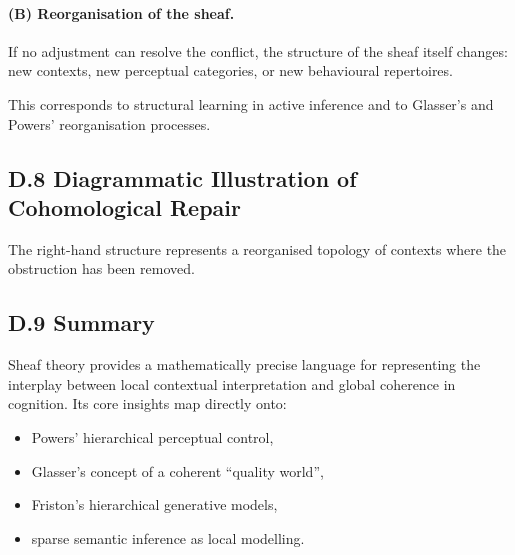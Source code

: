 \documentclass[11pt,a4paper,twoside]{article}
\begin{document}
\paragraph{(B) Reorganisation of the sheaf.}
If no adjustment can resolve the conflict, the structure of the sheaf itself changes: new contexts, new perceptual categories, or new behavioural repertoires.

This corresponds to structural learning in active inference and to Glasser’s and Powers’ reorganisation processes.

\subsection*{D.8 Diagrammatic Illustration of Cohomological Repair}

\begin{center}
\end{center}

The right-hand structure represents a reorganised topology of contexts where the obstruction has been removed.

\subsection*{D.9 Summary}

Sheaf theory provides a mathematically precise language for representing the interplay between local contextual interpretation and global coherence in cognition. Its core insights map directly onto:

\begin{itemize}
\item Powers’ hierarchical perceptual control,
\item Glasser’s concept of a coherent ``quality world'',
\item Friston’s hierarchical generative models,
\item sparse semantic inference as local modelling.
\end{itemize}
\end{document}
